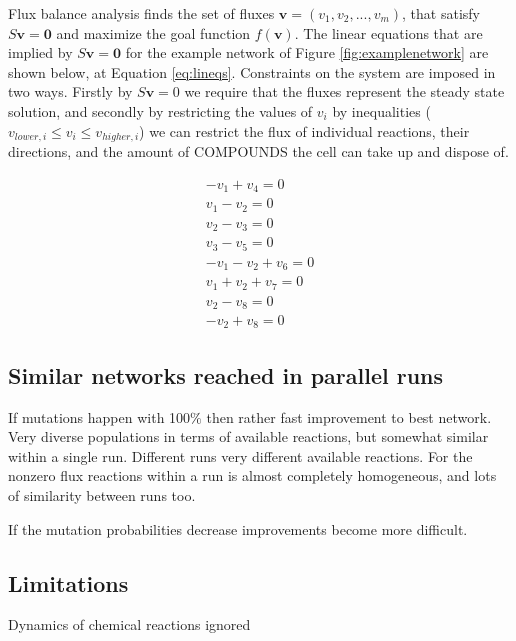 \documentclass[10pt,a4paper]{article}
\begin{document}
	Flux balance analysis finds the set of fluxes $\mathbf{v}=\left( v_1,v_2,...,v_m \right)$, that satisfy $S\mathbf{v}=\mathbf{0}$ and maximize the goal function $f \left( \mathbf{v} \right)$. The linear equations that are implied by $S\mathbf{v}=\mathbf{0}$ for the example network of Figure \ref{fig:examplenetwork} are shown below, at Equation \ref{eq:lineqs}. Constraints on the system are imposed in two ways. Firstly by $S\mathbf{v}=0$ we require that the fluxes represent the steady state solution, and secondly by restricting the values of $v_i$ by inequalities ($v_{lower,i}\leq v_i \leq v_{higher,i}$) we can restrict the flux of individual reactions, their directions, and the amount of COMPOUNDS the cell can take up and dispose of. 
	

	\begin{equation}\label{eq:lineqs}
		\begin{matrix}
			- v_1+v_4=0 \\
			v_1-v_2=0 \\
			v_2-v_3=0 \\
			v_3-v_5=0 \\
			-v_1-v_2+v_6=0 \\
			v_1+v_2+v_7=0 \\
			v_2-v_8=0 \\
			-v_2+v_8=0
		\end{matrix}
	\end{equation}



\subsection{Similar networks reached in parallel runs}
\label{sub:similar_networks_reached_in_paralell_runs}


If mutations happen with 100$\%$ then rather fast improvement to best network. Very diverse populations in terms of available reactions, but somewhat similar within a single run. Different runs very different available reactions. For the nonzero flux reactions within a run is almost completely homogeneous, and lots of similarity between runs too. 

If the mutation probabilities decrease improvements become more difficult.

\subsection{Limitations}
\label{sub:limitations}
Dynamics of chemical reactions ignored
\end{document}
